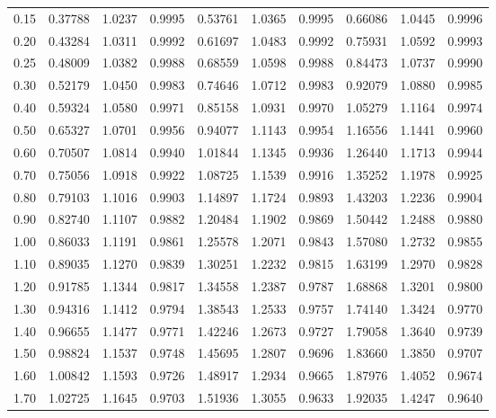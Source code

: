 {\begin{longtable}{|||d{3.2}|X|X|X|||}
%
0.15   & 0.37788  & 1.0237  & 0.9995  & 0.53761   & 1.0365  & 0.9995  & 0.66086  & 1.0445  & 0.9996 \\*  
0.20   & 0.43284  & 1.0311  & 0.9992  & 0.61697   & 1.0483  & 0.9992  & 0.75931  & 1.0592  & 0.9993 \\  
0.25   & 0.48009  & 1.0382  & 0.9988  & 0.68559   & 1.0598  & 0.9988  & 0.84473  & 1.0737  & 0.9990 \\  
0.30   & 0.52179  & 1.0450  & 0.9983  & 0.74646   & 1.0712  & 0.9983  & 0.92079  & 1.0880  & 0.9985 \\  
0.40   & 0.59324  & 1.0580  & 0.9971  & 0.85158   & 1.0931  & 0.9970  & 1.05279  & 1.1164  & 0.9974 \\  
0.50   & 0.65327  & 1.0701  & 0.9956  & 0.94077   & 1.1143  & 0.9954  & 1.16556  & 1.1441  & 0.9960 \\ 
0.60   & 0.70507  & 1.0814  & 0.9940  & 1.01844   & 1.1345  & 0.9936  & 1.26440  & 1.1713  & 0.9944 \\  
0.70   & 0.75056  & 1.0918  & 0.9922  & 1.08725   & 1.1539  & 0.9916  & 1.35252  & 1.1978  & 0.9925 \\  
0.80   & 0.79103  & 1.1016  & 0.9903  & 1.14897   & 1.1724  & 0.9893  & 1.43203  & 1.2236  & 0.9904 \\  
0.90   & 0.82740  & 1.1107  & 0.9882  & 1.20484   & 1.1902  & 0.9869  & 1.50442  & 1.2488  & 0.9880 \\[6pt]  
%
1.00   & 0.86033  & 1.1191  & 0.9861  & 1.25578   & 1.2071  & 0.9843  & 1.57080  & 1.2732  & 0.9855 \\* 
1.10   & 0.89035  & 1.1270  & 0.9839  & 1.30251   & 1.2232  & 0.9815  & 1.63199  & 1.2970  & 0.9828 \\  
1.20   & 0.91785  & 1.1344  & 0.9817  & 1.34558   & 1.2387  & 0.9787  & 1.68868  & 1.3201  & 0.9800 \\ 
1.30   & 0.94316  & 1.1412  & 0.9794  & 1.38543   & 1.2533  & 0.9757  & 1.74140  & 1.3424  & 0.9770 \\  
1.40   & 0.96655  & 1.1477  & 0.9771  & 1.42246   & 1.2673  & 0.9727  & 1.79058  & 1.3640  & 0.9739 \\  
1.50   & 0.98824  & 1.1537  & 0.9748  & 1.45695   & 1.2807  & 0.9696  & 1.83660  & 1.3850  & 0.9707 \\ 
1.60   & 1.00842  & 1.1593  & 0.9726  & 1.48917   & 1.2934  & 0.9665  & 1.87976  & 1.4052  & 0.9674 \\  
1.70   & 1.02725  & 1.1645  & 0.9703  & 1.51936   & 1.3055  & 0.9633  & 1.92035  & 1.4247  & 0.9640 \\* 

\end{longtable}}
